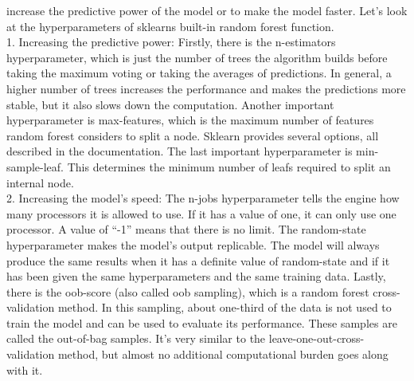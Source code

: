 \documentclass{article}
\begin{document}
increase the predictive power of the model or to make the model faster. Let's look at the hyperparameters of sklearns built-in random forest function.\\1. Increasing the predictive power: Firstly, there is the n-estimators hyperparameter, which is just the number of trees the algorithm builds before taking the maximum voting or taking the averages of predictions. In general, a higher number of trees increases the performance and makes the predictions more stable, but it also slows down the computation. Another important hyperparameter is max-features, which is the maximum number of features random forest considers to split a node. Sklearn provides several options, all described in the documentation. The last important hyperparameter is min-sample-leaf. This determines the minimum number of leafs required to split an internal node.\\2. Increasing the model's speed: The n-jobs hyperparameter tells the engine how many processors it is allowed to use. If it has a value of one, it can only use one processor. A value of “-1” means that there is no limit. The random-state hyperparameter makes the model’s output replicable. The model will always produce the same results when it has a definite value of random-state and if it has been given the same hyperparameters and the same training data. Lastly, there is the oob-score (also called oob sampling), which is a random forest cross-validation method. In this sampling, about one-third of the data is not used to train the model and can be used to evaluate its performance. These samples are called the out-of-bag samples. It's very similar to the leave-one-out-cross-validation method, but almost no additional computational burden goes along with it.

        
        
\end{document}
